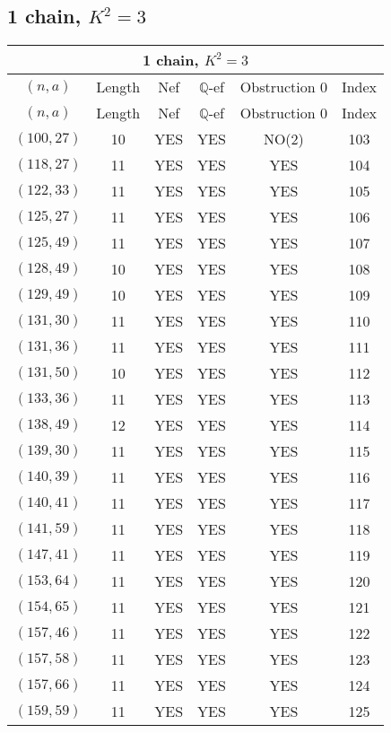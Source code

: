 \subsection{1 chain, $K^2 = 3$}
\begin{longtable}{|c|c|c|c|c|c|}
\hline
\multicolumn{6}{|c|}{1 chain, $K^2 = 3$}\\
\hline
$(n,a)$ & Length & Nef & $\mathbb Q$-ef & Obstruction 0 & Index\\
\hline
\endfirsthead

\hline
$(n,a)$ & Length & Nef & $\mathbb Q$-ef & Obstruction 0 & Index\\
\hline
\endhead
\hline
\endfoot

$(100, 27)$ & 10 & YES & YES & NO(2) & 103\\
$(118, 27)$ & 11 & YES & YES & YES & 104\\
$(122, 33)$ & 11 & YES & YES & YES & 105\\
$(125, 27)$ & 11 & YES & YES & YES & 106\\
$(125, 49)$ & 11 & YES & YES & YES & 107\\
$(128, 49)$ & 10 & YES & YES & YES & 108\\
$(129, 49)$ & 10 & YES & YES & YES & 109\\
$(131, 30)$ & 11 & YES & YES & YES & 110\\
$(131, 36)$ & 11 & YES & YES & YES & 111\\
$(131, 50)$ & 10 & YES & YES & YES & 112\\
$(133, 36)$ & 11 & YES & YES & YES & 113\\
$(138, 49)$ & 12 & YES & YES & YES & 114\\
$(139, 30)$ & 11 & YES & YES & YES & 115\\
$(140, 39)$ & 11 & YES & YES & YES & 116\\
$(140, 41)$ & 11 & YES & YES & YES & 117\\
$(141, 59)$ & 11 & YES & YES & YES & 118\\
$(147, 41)$ & 11 & YES & YES & YES & 119\\
$(153, 64)$ & 11 & YES & YES & YES & 120\\
$(154, 65)$ & 11 & YES & YES & YES & 121\\
$(157, 46)$ & 11 & YES & YES & YES & 122\\
$(157, 58)$ & 11 & YES & YES & YES & 123\\
$(157, 66)$ & 11 & YES & YES & YES & 124\\
$(159, 59)$ & 11 & YES & YES & YES & 125\\

\end{longtable}
